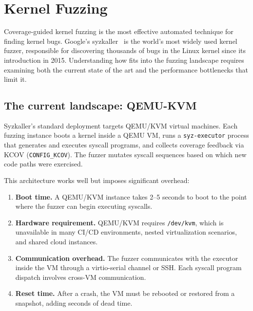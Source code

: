 \section{Kernel Fuzzing}
\label{sec:app-fuzzing}

Coverage-guided kernel fuzzing is the most effective automated technique
for finding kernel bugs.  Google's syzkaller~\cite{syzkaller,vyukov2015}
is the world's most widely used kernel fuzzer, responsible for
discovering thousands of bugs in the Linux kernel since its introduction
in 2015.  Understanding how \UML{} fits into the fuzzing landscape
requires examining both the current state of the art and the
performance bottlenecks that limit it.

\subsection{The current landscape: QEMU-KVM}

Syzkaller's standard deployment targets QEMU/KVM virtual machines.
Each fuzzing instance boots a kernel inside a QEMU VM, runs a
\texttt{syz-executor} process that generates and executes syscall
programs, and collects coverage feedback via KCOV
(\texttt{CONFIG\_KCOV}).  The fuzzer mutates syscall sequences based
on which new code paths were exercised.

This architecture works well but imposes significant overhead:

\begin{enumerate}[leftmargin=2em]
  \item \textbf{Boot time.}  A QEMU/KVM instance takes 2--5 seconds to
        boot to the point where the fuzzer can begin executing syscalls.
  \item \textbf{Hardware requirement.}  QEMU/KVM requires
        \texttt{/dev/kvm}, which is unavailable in many CI/CD environments,
        nested virtualization scenarios, and shared cloud instances.
  \item \textbf{Communication overhead.}  The fuzzer communicates with
        the executor inside the VM through a virtio-serial channel or SSH.
        Each syscall program dispatch involves cross-VM communication.
  \item \textbf{Reset time.}  After a crash, the VM must be rebooted
        or restored from a snapshot, adding seconds of dead time.
\end{enumerate}

